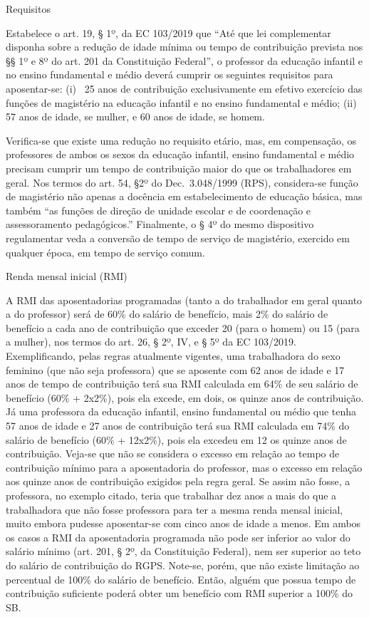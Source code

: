 \documentclass[
  letterpaper,
  DIV=11,
  numbers=noendperiod]{scrartcl}
\begin{document}
Requisitos

Estabelece o art. 19, § 1º, da EC 103/2019 que ``Até que lei
complementar disponha sobre a redução de idade mínima ou tempo de
contribuição prevista nos §§ 1º e 8º do art. 201 da Constituição
Federal'', o professor da educação infantil e no ensino fundamental e
médio deverá cumprir os seguintes requisitos para aposentar-se: (i) ~25
anos de contribuição exclusivamente em efetivo exercício das funções de
magistério na educação infantil e no ensino fundamental e médio; (ii) 57
anos de idade, se mulher, e 60 anos de idade, se homem.

Verifica-se que existe uma redução no requisito etário, mas, em
compensação, os professores de ambos os sexos da educação infantil,
ensino fundamental e médio precisam cumprir um tempo de contribuição
maior do que os trabalhadores em geral. Nos termos do art. 54, §2º do
Dec.~3.048/1999 (RPS), considera-se função de magistério não apenas a
docência em estabelecimento de educação básica, mas também ``as funções
de direção de unidade escolar e de coordenação e assessoramento
pedagógicos.'' Finalmente, o § 4º do mesmo dispositivo regulamentar veda
a conversão de tempo de serviço de magistério, exercido em qualquer
época, em tempo de serviço comum.

Renda mensal inicial (RMI)

A RMI das aposentadorias programadas (tanto a do trabalhador em geral
quanto a do professor) será de 60\% do salário de benefício, mais 2\% do
salário de benefício a cada ano de contribuição que exceder 20 (para o
homem) ou 15 (para a mulher), nos termos do art. 26, § 2º, IV, e § 5º da
EC 103/2019. Exemplificando, pelas regras atualmente vigentes, uma
trabalhadora do sexo feminino (que não seja professora) que se aposente
com 62 anos de idade e 17 anos de tempo de contribuição terá sua RMI
calculada em 64\% de seu salário de benefício (60\% + 2x2\%), pois ela
excede, em dois, os quinze anos de contribuição. Já uma professora da
educação infantil, ensino fundamental ou médio que tenha 57 anos de
idade e 27 anos de contribuição terá sua RMI calculada em 74\% do
salário de benefício (60\% + 12x2\%), pois ela excedeu em 12 os quinze
anos de contribuição. Veja-se que não se considera o excesso em relação
ao tempo de contribuição mínimo para a aposentadoria do professor, mas o
excesso em relação aos quinze anos de contribuição exigidos pela regra
geral. Se assim não fosse, a professora, no exemplo citado, teria que
trabalhar dez anos a mais do que a trabalhadora que não fosse professora
para ter a mesma renda mensal inicial, muito embora pudesse aposentar-se
com cinco anos de idade a menos. Em ambos os casos a RMI da
aposentadoria programada não pode ser inferior ao valor do salário
mínimo (art. 201, § 2º, da Constituição Federal), nem ser superior ao
teto do salário de contribuição do RGPS. Note-se, porém, que não existe
limitação ao percentual de 100\% do salário de benefício. Então, alguém
que possua tempo de contribuição suficiente poderá obter um benefício
com RMI superior a 100\% do SB.
\end{document}
